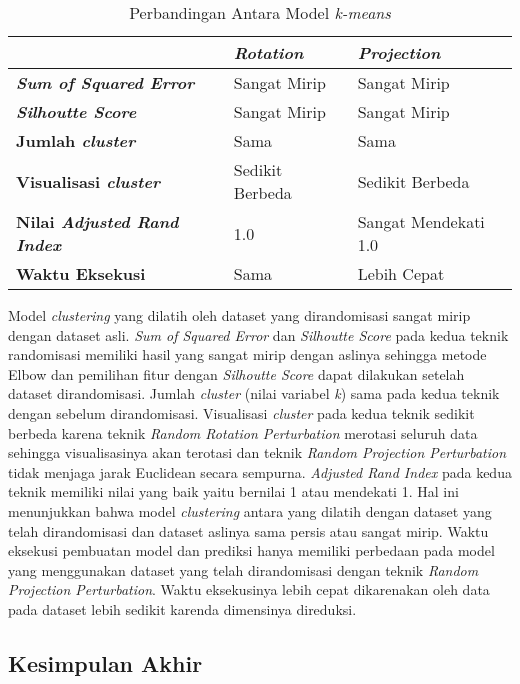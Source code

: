 \begin{table}
	\centering
	\caption{Perbandingan Antara Model \textit{k-means}}
	\begin{tabular}{|l|l|l|}
		\hline
		& \textbf{\textit{Rotation}} & \textbf{\textit{Projection}} \\ \hline
		\textbf{\textit{Sum of Squared Error}} & Sangat Mirip & Sangat Mirip \\
		\textbf{\textit{Silhoutte Score}} & Sangat Mirip & Sangat Mirip \\
		\textbf{Jumlah \textit{cluster}} & Sama & Sama \\
		\textbf{Visualisasi \textit{cluster}} & Sedikit Berbeda & Sedikit Berbeda \\
		\textbf{Nilai \textit{Adjusted Rand Index}} & 1.0 & Sangat Mendekati 1.0 \\
		\textbf{Waktu Eksekusi} & Sama & Lebih Cepat \\
		\hline
	\end{tabular}
	\label{table:perbandingan-clustering}
\end{table}

Model \textit{clustering} yang dilatih oleh dataset yang dirandomisasi sangat mirip dengan dataset asli. \textit{Sum of Squared Error} dan \textit{Silhoutte Score} pada kedua teknik randomisasi memiliki hasil yang sangat mirip dengan aslinya sehingga metode Elbow dan pemilihan fitur dengan \textit{Silhoutte Score} dapat dilakukan setelah dataset dirandomisasi. Jumlah \textit{cluster} (nilai variabel \textit{k}) sama pada kedua teknik dengan sebelum dirandomisasi. Visualisasi \textit{cluster} pada kedua teknik sedikit berbeda karena teknik \textit{Random Rotation Perturbation} merotasi seluruh data sehingga visualisasinya akan terotasi dan teknik \textit{Random Projection Perturbation} tidak menjaga jarak Euclidean secara sempurna. \textit{Adjusted Rand Index} pada kedua teknik memiliki nilai yang baik yaitu bernilai 1 atau mendekati 1. Hal ini menunjukkan bahwa model \textit{clustering} antara yang dilatih dengan dataset yang telah dirandomisasi dan dataset aslinya sama persis atau sangat mirip. Waktu eksekusi pembuatan model dan prediksi hanya memiliki perbedaan pada model yang menggunakan dataset yang telah dirandomisasi dengan teknik \textit{Random Projection Perturbation}. Waktu eksekusinya lebih cepat dikarenakan oleh data pada dataset lebih sedikit karenda dimensinya direduksi.

\subsection{Kesimpulan Akhir}
\label{subsec:kesimpulan-eksperimental}

